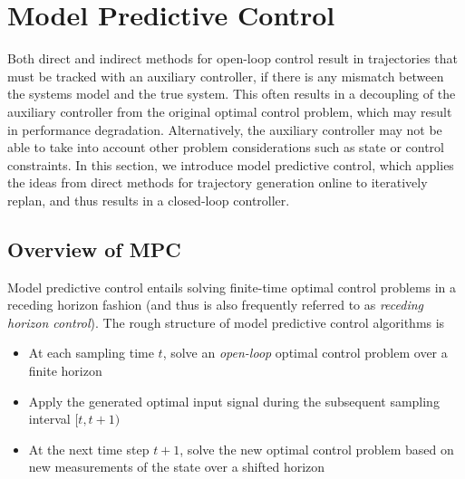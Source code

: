\chapter{Model Predictive Control}

Both direct and indirect methods for open-loop control result in trajectories that must be tracked with an auxiliary controller, if there is any mismatch between the systems model and the true system. This often results in a decoupling of the auxiliary controller from the original optimal control problem, which may result in performance degradation. Alternatively, the auxiliary controller may not be able to take into account other problem considerations such as state or control constraints. In this section, we introduce model predictive control, which applies the ideas from direct methods for trajectory generation online to iteratively replan, and thus results in a closed-loop controller.

\section{Overview of MPC}

Model predictive control entails solving finite-time optimal control problems in a receding horizon fashion (and thus is also frequently referred to as \textit{receding horizon control}). The rough structure of model predictive control algorithms is
\begin{itemize}
    \item At each sampling time $t$, solve an \textit{open-loop} optimal control problem over a finite horizon
    \item Apply the generated optimal input signal during the subsequent sampling interval $[t,t+1)$
    \item At the next time step $t+1$, solve the new optimal control problem based on new measurements of the state over a shifted horizon
\end{itemize}

